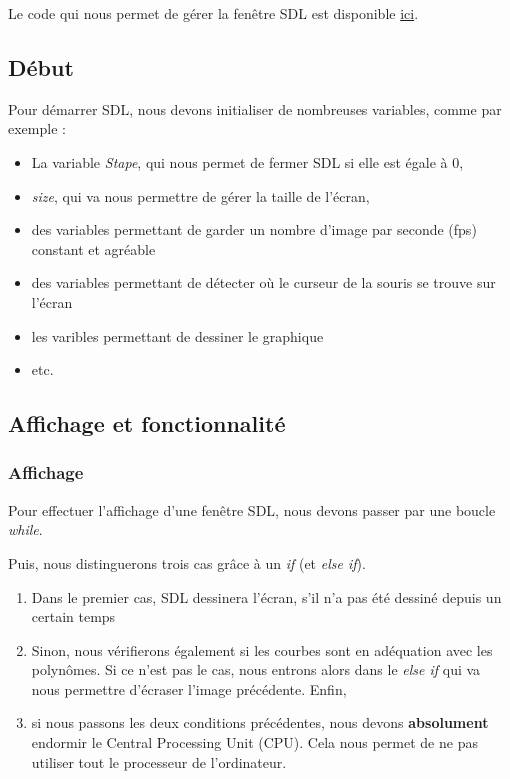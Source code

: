 \documentclass[letter]{article}
\begin{document}
Le code qui nous permet de gérer la fenêtre SDL est disponible \href{render.c}{ici}.

\subsection{Début}
\label{sec:org69a8fbe}

Pour démarrer SDL, nous devons initialiser de nombreuses variables, comme par exemple :

\begin{itemize}
\item La variable \emph{Stape}, qui nous permet de fermer SDL si elle est égale à 0,
\item \emph{size}, qui va nous permettre de gérer la taille de l'écran,
\item des variables permettant de garder un nombre d'image par seconde (fps) constant et agréable
\item des variables permettant de détecter où le curseur de la souris se trouve sur l'écran
\item les varibles permettant de dessiner le graphique
\item etc.
\end{itemize}




\subsection{Affichage et fonctionnalité}
\label{sec:orga1147ff}

\subsubsection{Affichage}
\label{sec:orgd436556}

Pour effectuer l'affichage d'une fenêtre SDL, nous devons passer par une boucle \emph{while}.

Puis, nous distinguerons trois cas grâce à un \emph{if} (et \emph{else if}).

\begin{enumerate}
\item Dans le premier cas, SDL dessinera l'écran, s'il n'a pas été dessiné depuis un certain temps
\item Sinon, nous vérifierons également si les courbes sont en adéquation avec les polynômes. Si ce n'est pas le cas, nous entrons alors dans le \emph{else if} qui va nous permettre d'écraser l'image précédente. Enfin,
\item si nous passons les deux conditions précédentes, nous devons \textbf{absolument} endormir le Central Processing Unit (CPU). Cela nous permet de ne pas utiliser tout le processeur de l'ordinateur.
\end{enumerate}
\end{document}
